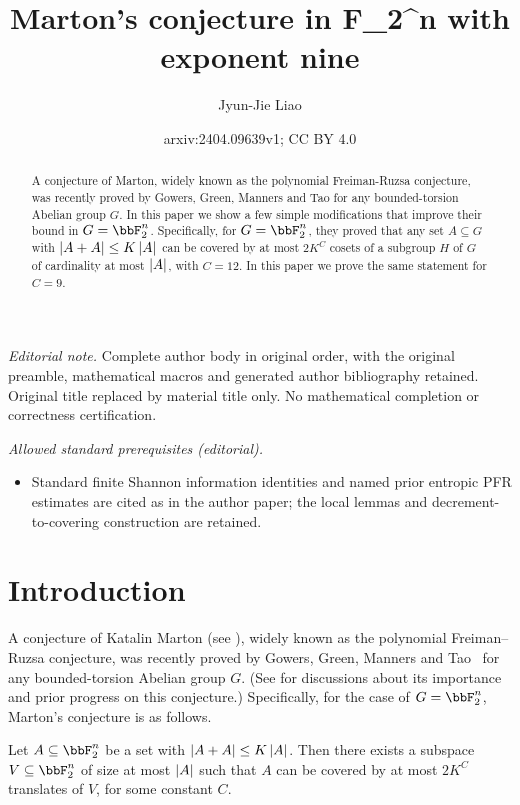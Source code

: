 \documentclass{article}
\title{Marton's conjecture in F\_2\textasciicircum{}n with exponent nine}
\author{Jyun-Jie Liao}
\date{arxiv:2404.09639v1; CC BY 4.0}
\begin{document}
\maketitle
\noindent\textit{Editorial note.} Complete author body in original order, with the original preamble, mathematical macros and generated author bibliography retained. Original title replaced by material title only. No mathematical completion or correctness certification.\par\medskip
\noindent\textit{Allowed standard prerequisites (editorial).}\begin{itemize}
\item Standard finite Shannon information identities and named prior entropic PFR estimates are cited as in the author paper; the local lemmas and decrement-to-covering construction are retained.
\end{itemize}\medskip
\begin{abstract}
A conjecture of Marton, widely known as the polynomial Freiman-Ruzsa conjecture, was recently proved by Gowers, Green, Manners and Tao for any bounded-torsion Abelian group $G$. In this paper we show a few simple modifications that improve their bound in $G=\bbF_2^n$. Specifically, for $G=\bbF_2^n$, they proved that any set $A\subseteq G$ with $\left|A+A\right|\le K\left|A\right|$ can be covered by at most $2K^C$ cosets of a subgroup $H$ of $G$ of cardinality at most $\left|A\right|$, with $C=12$. In this paper we prove the same statement for $C=9$.
\end{abstract}

\section{Introduction}

A conjecture of Katalin Marton (see \cite{PFR}), widely known as the polynomial Freiman–Ruzsa conjecture, was recently proved by Gowers, Green, Manners and Tao~\cite{GGMT23,GGMT24} for any bounded-torsion Abelian group $G$. (See \cite{GGMT23} for discussions about its importance and prior progress on this conjecture.) Specifically, for the case of $G=\bbF_2^n$, Marton's conjecture is as follows.

\begin{conjecture}\label{conj:Marton}
Let $A\subseteq \bbF_2^n$ be a set with $\left|A+A\right|\le K\left|A\right|$. Then there exists a subspace $V\subseteq \bbF_2^n$ of size at most $\left|A\right|$ such that $A$ can be covered by at most $2K^C$ translates of $V$, for some constant $C$.
\end{conjecture}
\end{document}
